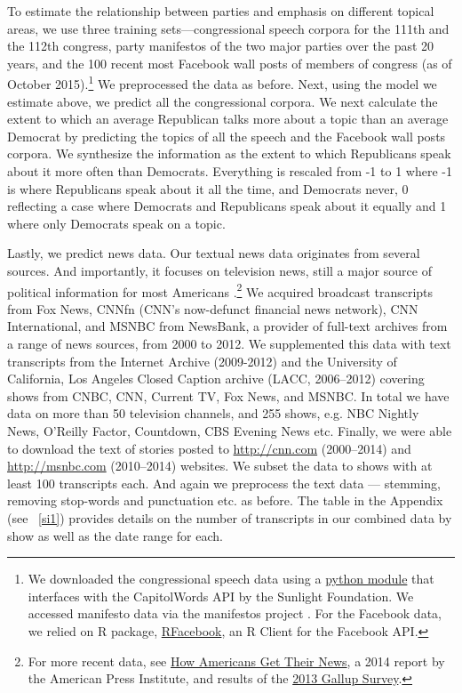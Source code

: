 \documentclass[12pt, letterpaper]{article}
\begin{document}
To estimate the relationship between parties and emphasis on different topical areas, we use three training sets---congressional speech corpora for the 111th and the 112th congress, party manifestos of the two major parties over the past 20 years, and the 100 recent most Facebook wall posts of members of congress (as of October 2015).\footnote{We downloaded the congressional speech data using a \href{https://github.com/soodoku/speech-learn/blob/master/scripts/capitol_speech.py}{python module} that interfaces with the CapitolWords API by the Sunlight Foundation. We accessed manifesto data via the manifestos project \citep{manifesto2015}. For the Facebook data, we relied on R package, \href{https://github.com/pablobarbera/Rfacebook}{RFacebook}, an R Client for the Facebook API.} We preprocessed the data as before. Next, using the model we estimate above, we predict all the congressional corpora. We next calculate the extent to which an average Republican talks more about a topic than an average Democrat by predicting the topics of all the speech and the Facebook wall posts corpora. We synthesize the information as the extent to which Republicans speak about it more often than Democrats. Everything is rescaled from -1 to 1 where -1 is where Republicans speak about it all the time, and Democrats never, 0 reflecting a case where Democrats and Republicans speak about it equally and 1 where only Democrats speak on a topic.

Lastly, we predict news data. Our textual news data originates from several sources. And importantly, it focuses on television news, still a major source of political information for most Americans \citep{chaffee1996americans}.\footnote{For more recent data, see \href{http://www.americanpressinstitute.org/publications/reports/survey-research/how-americans-get-news/}{How Americans Get Their News}, a 2014 report by the American Press Institute, and results of the \href{http://www.gallup.com/poll/163412/americans-main-source-news.aspx}{2013 Gallup Survey}.} We acquired broadcast transcripts from Fox News, CNNfn (CNN's now-defunct financial news network), CNN International, and MSNBC from NewsBank, a provider of full-text archives from a range of news sources, from 2000 to 2012. We supplemented this data with text transcripts from the Internet Archive (2009-2012) and the University of California, Los Angeles Closed Caption archive (LACC, 2006--2012) covering shows from CNBC, CNN, Current TV, Fox News, and MSNBC. In total we have data on more than 50 television channels, and 255 shows, e.g. NBC Nightly News, O'Reilly Factor, Countdown, CBS Evening News etc. Finally, we were able to download the text of stories posted to \href{CNN.com}{http://cnn.com} (2000--2014) and \href{MSNBC.com}{http://msnbc.com} (2010--2014) websites. We subset the data to shows with at least 100 transcripts each. And again we preprocess the text data --- stemming, removing stop-words and punctuation etc. as before. The table in the Appendix (see ~\ref{si1}) provides details on the number of transcripts in our combined data by show as well as the date range for each.
\end{document}

